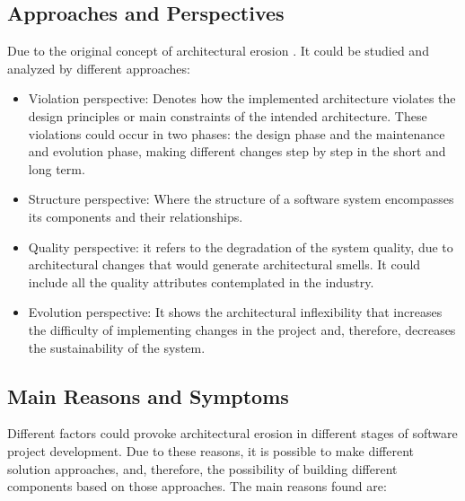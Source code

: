 \subsection{Approaches and Perspectives}
Due to the original concept of architectural erosion \citet{slr-base}. It could be studied and analyzed by different approaches:

\begin{itemize}
    \item Violation perspective: Denotes how the implemented architecture violates the design principles or main constraints of the intended architecture. These violations could occur in two phases: the design phase and the maintenance and evolution phase, making different changes step by step in the short and long term.
    \item Structure perspective: Where the structure of a software system encompasses its components and their relationships.
    \item Quality perspective: it refers to the degradation of the system quality, due to architectural changes that would generate architectural smells. It could include all the quality attributes contemplated in the industry.
    \item Evolution perspective: It shows the architectural inflexibility that increases the difficulty of implementing changes in the project and, therefore, decreases the sustainability of the system.

\end{itemize}

\subsection{Main Reasons and Symptoms }
Different factors could provoke architectural erosion in different stages of software project development. Due to these reasons, it is possible to make different solution approaches, and, therefore, the possibility of building different components based on those approaches. The main reasons found are:	


